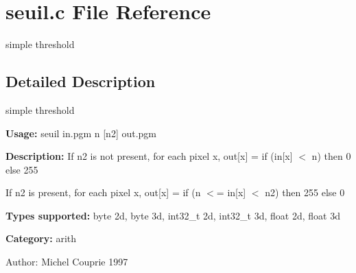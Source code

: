 \section{seuil.c File Reference}
\label{seuil_8c}
simple threshold  




\label{_details}
\subsection{Detailed Description}
simple threshold 

{\bf Usage:} seuil in.pgm n [n2] out.pgm

{\bf Description:} If n2 is not present, for each pixel x, out[x] = if (in[x] $<$ n) then 0 else 255

If n2 is present, for each pixel x, out[x] = if (n $<$= in[x] $<$ n2) then 255 else 0

{\bf Types supported:} byte 2d, byte 3d, int32\_\-t 2d, int32\_\-t 3d, float 2d, float 3d

{\bf Category:} arith

\begin{Desc}
\item[Author:]Michel Couprie 1997 \end{Desc}
